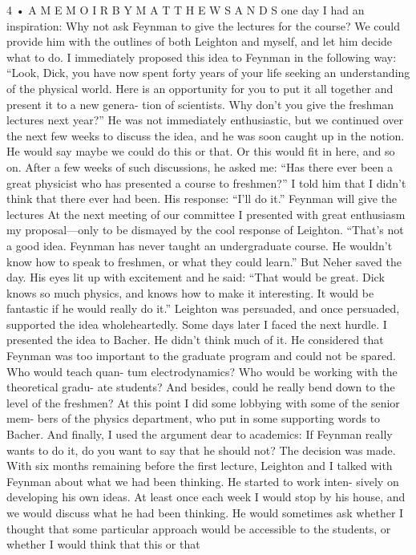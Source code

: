 \documentclass[11pt,oneside]{article}
\begin{document}
4 • A  M E M O I R  B Y  M A T T H E W  S A N D S one day I had an inspiration: Why not ask Feynman to give the lectures for the course? We could provide him with the outlines of both Leighton and myself, and let him decide what to do. I immediately proposed this idea to Feynman in the following way: “Look, Dick, you have now spent forty years of your life seeking an understanding of the physical world. Here is an opportunity for you to put it all together and present it to a new genera- tion of scientists. Why don’t you give the freshman lectures next year?” He was not immediately enthusiastic, but we continued over the next few weeks to discuss the idea, and he was soon caught up in the notion. He would say maybe we could do this or that. Or this would fit in here, and so on. After a few weeks of such discussions, he asked me: “Has there ever been a great physicist who has presented a course to freshmen?” I told him that I didn’t think that there ever had been. His response: “I’ll do it.” Feynman will give the lectures At the next meeting of our committee I presented with great enthusiasm my proposal---only to be dismayed by the cool response of Leighton. “That’s not a good idea. Feynman has never taught an undergraduate course. He wouldn’t know how to speak to freshmen, or what they could learn.” But Neher saved the day. His eyes lit up with excitement and he said: “That would be great. Dick knows so much physics, and knows how to make it interesting. It would be fantastic if he would really do it.” Leighton was persuaded, and once persuaded, supported the idea wholeheartedly. Some days later I faced the next hurdle. I presented the idea to Bacher. He didn’t think much of it. He considered that Feynman was too important to the graduate program and could not be spared. Who would teach quan- tum electrodynamics? Who would be working with the theoretical gradu- ate students? And besides, could he really bend down to the level of the freshmen? At this point I did some lobbying with some of the senior mem- bers of the physics department, who put in some supporting words to Bacher. And finally, I used the argument dear to academics: If Feynman really wants to do it, do you want to say that he should not? The decision was made. With six months remaining before the first lecture, Leighton and I talked with Feynman about what we had been thinking. He started to work inten- sively on developing his own ideas. At least once each week I would stop by his house, and we would discuss what he had been thinking. He would sometimes ask whether I thought that some particular approach would be accessible to the students, or whether I would think that this or that\par
\end{document}

